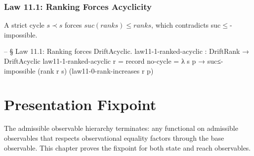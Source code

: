 \documentclass[11pt,a4paper]{book}
\def\texttt#1{#1}%
\begin{document}
\subsection{Law 11.1: Ranking Forces Acyclicity}

A strict cycle $s \prec s$ forces $\texttt{suc (rank s)} \le \texttt{rank s}$, which contradicts \texttt{suc$\le$-impossible}.

\begin{code}
-- § Law 11.1: Ranking forces DriftAcyclic.
law11-1-ranked-acyclic : DriftRank → DriftAcyclic
law11-1-ranked-acyclic r =
  record
    { no-cycle =
        λ s p →
          suc≤-impossible (rank r s) (law11-0-rank-increases r p)
    }
\end{code}

\chapter{Presentation Fixpoint}

The admissible observable hierarchy terminates: any functional on admissible observables that respects observational equality factors through the base observable. This chapter proves the fixpoint for both state and reach observables.
\end{document}
